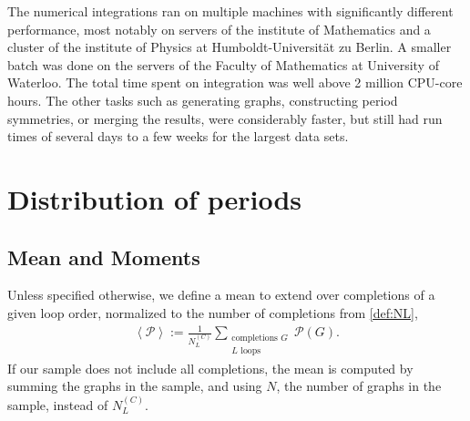 \documentclass[11pt,a4paper]{article}
\newcommand{\period}{\mathcal P}
\renewcommand{\|}{\rule[-0.4ex]{0.2ex}{1.2em}}
\begin{document}
The numerical integrations ran on multiple machines with significantly different performance, most notably  on servers of the institute of Mathematics and a cluster of the institute of Physics at Humboldt-Universität zu Berlin. A smaller batch was done on the servers of the Faculty of Mathematics at University of Waterloo.  The total time spent on integration was well above 2 million CPU-core hours. The other tasks such as generating graphs, constructing period symmetries, or merging the results, were considerably faster, but still had run times of several days to a few weeks for the largest data sets.












\FloatBarrier




\section{Distribution of periods}\label{sec:distribution}






\subsection{Mean and Moments}\label{sec:moments}

Unless specified otherwise, we define a mean to extend over completions of a given loop order, normalized to the number of  completions  from \cref{def:NL}, 
\begin{align}\label{def:period_mean}
 \left \langle \period  \right \rangle  :=  \frac{1}{N^{(C)}_L}\sum_{\substack{ \text{completions }G \\ L \text{ loops} }} \period (G) . 
\end{align}
If our sample does not include all completions, the mean is computed by summing the graphs in the sample, and using $N$,  the number of graphs in the sample, instead of $N^{(C)}_L$. 
\end{document}

